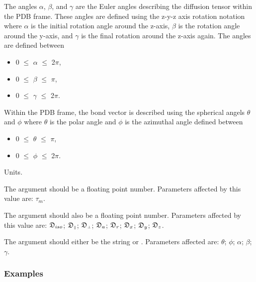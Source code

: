 The angles $\alpha$, $\beta$, and $\gamma$ are the Euler angles describing the diffusion tensor within the PDB frame.  These angles are defined using the z-y-z axis rotation notation where $\alpha$ is the initial rotation angle around the z-axis, $\beta$ is the rotation angle around the y-axis, and $\gamma$ is the final rotation around the z-axis again.  The angles are defined between


\begin{itemize}
\item[] 0 $\le$ $\alpha$ $\le$ 2$\pi$, 
\item[] 0 $\le$ $\beta$ $\le$ $\pi$, 
\item[] 0 $\le$ $\gamma$ $\le$ 2$\pi$. 
\end{itemize}


Within the PDB frame, the bond vector is described using the spherical angels $\theta$ and $\phi$ where $\theta$ is the polar angle and $\phi$ is the azimuthal angle defined between


\begin{itemize}
\item[] 0 $\le$ $\theta$ $\le$ $\pi$, 
\item[] 0 $\le$ $\phi$ $\le$ 2$\pi$. 
\end{itemize}


Units.


The  argument should be a floating point number.  Parameters affected by this value are:  $\tau_m$.


The  argument should also be a floating point number.  Parameters affected by this value are:  $\mathfrak{D}_{iso}$; $\mathfrak{D}_{\scriptscriptstyle \parallel}$; $\mathfrak{D}_{\scriptscriptstyle \perp}$; $\mathfrak{D}_a$; $\mathfrak{D}_r$; $\mathfrak{D}_x$; $\mathfrak{D}_y$; $\mathfrak{D}_z$.


The  argument should either be the string  or .  Parameters affected are:  $\theta$; $\phi$; $\alpha$; $\beta$; $\gamma$.



\subsubsection{Examples}

